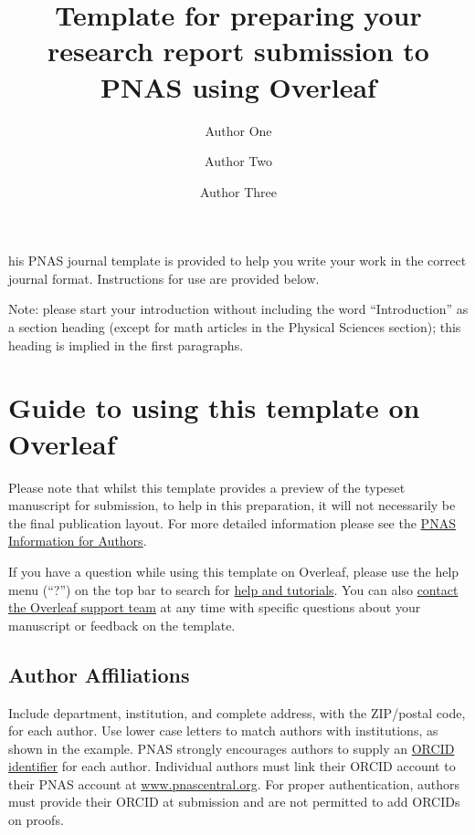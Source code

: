 \documentclass[9pt,twocolumn,twoside,lineno]{pnas-new}
\title{Template for preparing your research report submission to PNAS using Overleaf}
\author[a,c,1]{Author One}
\author[b,1,2]{Author Two}
\author[a]{Author Three}
\affil[a]{Affiliation One}
\affil[b]{Affiliation Two}
\affil[c]{Affiliation Three}
\begin{document}
\maketitle
\thispagestyle{firststyle}

his PNAS journal template is provided to help you write your work in the correct journal format. Instructions for use are provided below.

Note: please start your introduction without including the word ``Introduction'' as a section heading (except for math articles in the Physical Sciences section); this heading is implied in the first paragraphs.

\section*{Guide to using this template on Overleaf}

Please note that whilst this template provides a preview of the typeset manuscript for submission, to help in this preparation, it will not necessarily be the final publication layout. For more detailed information please see the \href{https://www.pnas.org/page/authors/format}{PNAS Information for Authors}.

If you have a question while using this template on Overleaf, please use the help menu (``?'') on the top bar to search for \href{https://www.overleaf.com/help}{help and tutorials}. You can also \href{https://www.overleaf.com/contact}{contact the Overleaf support team} at any time with specific questions about your manuscript or feedback on the template.

\subsection*{Author Affiliations}

Include department, institution, and complete address, with the ZIP/postal code, for each author. Use lower case letters to match authors with institutions, as shown in the example. PNAS strongly encourages authors to supply an \href{https://orcid.org/}{ORCID identifier} for each author. Individual authors must link their ORCID account to their PNAS account at \href{http://www.pnascentral.org/}{www.pnascentral.org}. For proper authentication, authors must provide their ORCID at submission and are not permitted to add ORCIDs on proofs.
\end{document}
